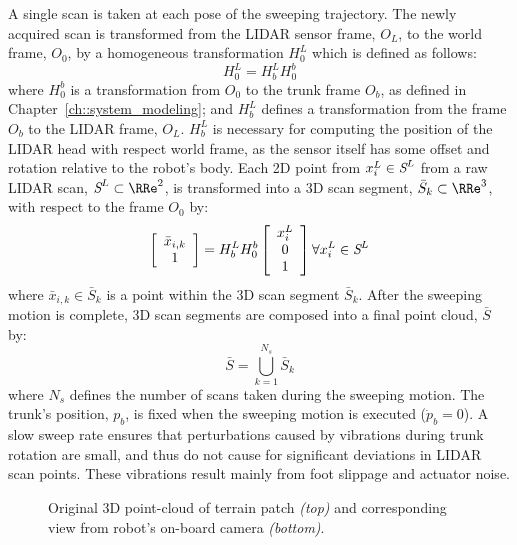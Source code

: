 			A single scan is taken at each \Kth pose of the sweeping trajectory. The newly acquired scan is transformed from the LIDAR sensor frame, $O_{L}$, to the world frame, $O_{0}$, by a homogeneous transformation $H^{L}_{0}$ which is defined as follows:
				\begin{equation}
					H^{L}_{0} = H^{L}_{b} H^{b}_{0}
					\label{eq::world_to_sensor}
				\end{equation}
			where $H^{b}_{0}$ is a transformation from $O_{0}$ to the trunk frame $O_{b}$, as defined in Chapter~\ref{ch::system_modeling}; and $H^{L}_{b}$ defines a transformation from the frame $O_{b}$ to the LIDAR frame, $O_{L}$. $H^{L}_{b}$ is necessary for computing the position of the LIDAR head with respect world frame, as the sensor itself has some offset and rotation relative to the robot's body. Each 2D point from $x_{i}^{L} \in \emph{S}^{L}$ from a raw LIDAR scan, $\emph{S}^{L} \subset \RRe^{2}$, is transformed into a 3D scan segment, $\bar{S}_{k} \subset \RRe^{3}$, with respect to the frame $O_{0}$ by:
				\begin{equation}
					\left[
						\begin{array}{c}
							\bar{x}_{i,k} \\ 1
						\end{array}
					\right]
				 = H^{L}_{b} H^{b}_{0}	
					\left[
						\begin{array}{c}
							x_{i}^{L} \\ 0 \\ 1
						\end{array}
					\right] \forall x_{i}^{L} \in \emph{S}^{L}
					\label{eq::scan_to_segment}
				\end{equation}
			where $\bar{x}_{i,k} \in \bar{S}_{k}$ is a point within the \Kth 3D scan segment $\bar{S}_{k}$. After the sweeping motion is complete, 3D scan segments are composed into a final point cloud, $\bar{S}$ by:
				\begin{equation}
					\bar{S} = \bigcup_{k=1}^{N_{s}} \bar{S}_{k}
					\label{eq::scan_composition}
				\end{equation}
			where $N_{s}$ defines the number of scans taken during the sweeping motion. The trunk's position, $p_{b}$, is fixed when the sweeping motion is executed (\IE $\dot{p}_{b}=0$). A slow sweep rate ensures that perturbations caused by vibrations during trunk rotation are small, and thus do not cause for significant deviations in LIDAR scan points. These vibrations result mainly from foot slippage and actuator noise.
				\begin{figure}[!h]
					\centering
					\caption{Original 3D point-cloud of terrain patch \emph{(top)} and corresponding view from robot's on-board camera \emph{(bottom)}.}
					\label{fig::pointcloud_terrain_patch}
				\end{figure}




